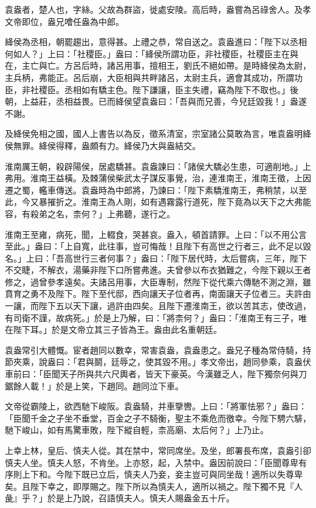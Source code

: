 
\begin{pinyinscope}
袁盎者，楚人也，字絲。父故為群盜，徙處安陵。高后時，盎嘗為呂祿舍人。及孝文帝即位，盎兄噲任盎為中郎。

絳侯為丞相，朝罷趨出，意得甚。上禮之恭，常自送之。袁盎進曰：「陛下以丞相何如人？」上曰：「社稷臣。」盎曰：「絳侯所謂功臣，非社稷臣，社稷臣主在與在，主亡與亡。方呂后時，諸呂用事，擅相王，劉氏不絕如帶。是時絳侯為太尉，主兵柄，弗能正。呂后崩，大臣相與共畔諸呂，太尉主兵，適會其成功，所謂功臣，非社稷臣。丞相如有驕主色。陛下謙讓，臣主失禮，竊為陛下不取也。」後朝，上益莊，丞相益畏。已而絳侯望袁盎曰：「吾與而兄善，今兒廷毀我！」盎遂不謝。

及絳侯免相之國，國人上書告以為反，徵系清室，宗室諸公莫敢為言，唯袁盎明絳侯無罪。絳侯得釋，盎頗有力。絳侯乃大與盎結交。

淮南厲王朝，殺辟陽侯，居處驕甚。袁盎諫曰：「諸侯大驕必生患，可適削地。」上弗用。淮南王益橫。及棘蒲侯柴武太子謀反事覺，治，連淮南王，淮南王徵，上因遷之蜀，轞車傳送。袁盎時為中郎將，乃諫曰：「陛下素驕淮南王，弗稍禁，以至此，今又暴摧折之。淮南王為人剛，如有遇霧露行道死，陛下竟為以天下之大弗能容，有殺弟之名，柰何？」上弗聽，遂行之。

淮南王至雍，病死，聞，上輟食，哭甚哀。盎入，頓首請罪。上曰：「以不用公言至此。」盎曰：「上自寬，此往事，豈可悔哉！且陛下有高世之行者三，此不足以毀名。」上曰：「吾高世行三者何事？」盎曰：「陛下居代時，太后嘗病，三年，陛下不交睫，不解衣，湯藥非陛下口所嘗弗進。夫曾參以布衣猶難之，今陛下親以王者修之，過曾參孝遠矣。夫諸呂用事，大臣專制，然陛下從代乘六傳馳不測之淵，雖賁育之勇不及陛下。陛下至代邸，西向讓天子位者再，南面讓天子位者三。夫許由一讓，而陛下五以天下讓，過許由四矣。且陛下遷淮南王，欲以苦其志，使改過，有司衛不謹，故病死。」於是上乃解，曰：「將柰何？」盎曰：「淮南王有三子，唯在陛下耳。」於是文帝立其三子皆為王。盎由此名重朝廷。

袁盎常引大體慨。宦者趙同以數幸，常害袁盎，袁盎患之。盎兄子種為常侍騎，持節夾乘，說盎曰：「君與鬬，廷辱之，使其毀不用。」孝文帝出，趙同參乘，袁盎伏車前曰：「臣聞天子所與共六尺輿者，皆天下豪英。今漢雖乏人，陛下獨奈何與刀鋸餘人載！」於是上笑，下趙同。趙同泣下車。

文帝從霸陵上，欲西馳下峻阪。袁盎騎，并車擥轡。上曰：「將軍怯邪？」盎曰：「臣聞千金之子坐不垂堂，百金之子不騎衡，聖主不乘危而徼幸。今陛下騁六騑，馳下峻山，如有馬驚車敗，陛下縱自輕，柰高廟、太后何？」上乃止。

上幸上林，皇后、慎夫人從。其在禁中，常同席坐。及坐，郎署長布席，袁盎引卻慎夫人坐。慎夫人怒，不肯坐。上亦怒，起，入禁中。盎因前說曰：「臣聞尊卑有序則上下和。今陛下既已立后，慎夫人乃妾，妾主豈可與同坐哉！適所以失尊卑矣。且陛下幸之，即厚賜之。陛下所以為慎夫人，適所以禍之。陛下獨不見『人彘』乎？」於是上乃說，召語慎夫人。慎夫人賜盎金五十斤。


\end{pinyinscope}
